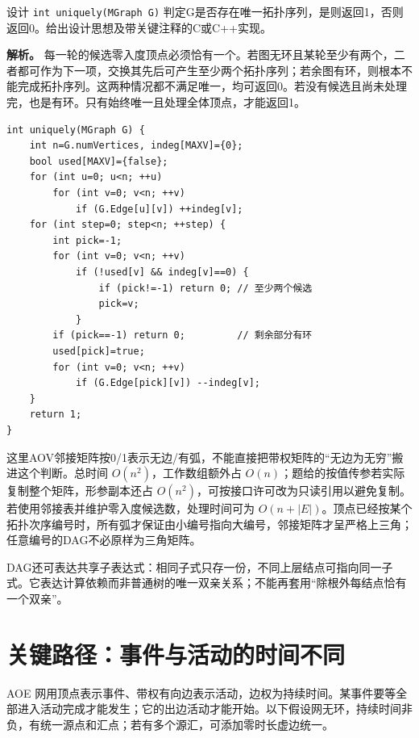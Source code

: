 设计 \texttt{int\ uniquely(MGraph\ G)} 判定G是否存在唯一拓扑序列，是则返回1，否则返回0。给出设计思想及带关键注释的C或C++实现。


\textbf{解析。} 每一轮的候选零入度顶点必须恰有一个。若图无环且某轮至少有两个，二者都可作为下一项，交换其先后可产生至少两个拓扑序列；若余图有环，则根本不能完成拓扑序列。这两种情况都不满足唯一，均可返回0。若没有候选且尚未处理完，也是有环。只有始终唯一且处理全体顶点，才能返回1。

\par\medskip\noindent
\begin{minipage}{\linewidth}
\begin{verbatim}
int uniquely(MGraph G) {
    int n=G.numVertices, indeg[MAXV]={0};
    bool used[MAXV]={false};
    for (int u=0; u<n; ++u)
        for (int v=0; v<n; ++v)
            if (G.Edge[u][v]) ++indeg[v];
    for (int step=0; step<n; ++step) {
        int pick=-1;
        for (int v=0; v<n; ++v)
            if (!used[v] && indeg[v]==0) {
                if (pick!=-1) return 0; // 至少两个候选
                pick=v;
            }
        if (pick==-1) return 0;         // 剩余部分有环
        used[pick]=true;
        for (int v=0; v<n; ++v)
            if (G.Edge[pick][v]) --indeg[v];
    }
    return 1;
}
\end{verbatim}
\end{minipage}\par\medskip

这里AOV邻接矩阵按0/1表示无边/有弧，不能直接把带权矩阵的``无边为无穷''搬进这个判断。总时间 \(O(n^2)\)，工作数组额外占 \(O(n)\)；题给的按值传参若实际复制整个矩阵，形参副本还占 \(O(n^2)\)，可按接口许可改为只读引用以避免复制。若使用邻接表并维护零入度候选数，处理时间可为 \(O(n+|E|)\)。顶点已经按某个拓扑次序编号时，所有弧才保证由小编号指向大编号，邻接矩阵才呈严格上三角；任意编号的DAG不必原样为三角矩阵。

DAG还可表达共享子表达式：相同子式只存一份，不同上层结点可指向同一子式。它表达计算依赖而非普通树的唯一双亲关系；不能再套用``除根外每结点恰有一个双亲''。

\section{关键路径：事件与活动的时间不同}\label{ds-06-09}

AOE 网用顶点表示事件、带权有向边表示活动，边权为持续时间。某事件要等全部进入活动完成才能发生；它的出边活动才能开始。以下假设网无环，持续时间非负，有统一源点和汇点；若有多个源汇，可添加零时长虚边统一。

